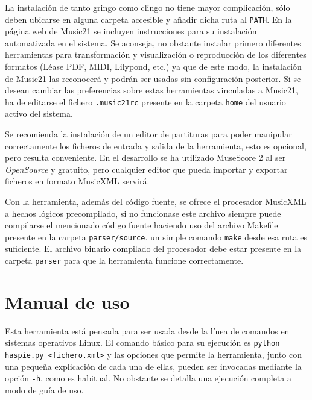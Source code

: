 La instalación de tanto gringo como clingo no tiene mayor complicación, sólo deben ubicarse en alguna carpeta accesible y añadir dicha ruta al \texttt{PATH}. En la página web de Music21 se incluyen instrucciones para su instalación automatizada en el sistema. Se aconseja, no obstante instalar primero diferentes herramientas para transformación y visualización o reproducción de los diferentes formatos (Léase PDF, MIDI, Lilypond, etc.) ya que de este modo, la instalación de Music21 las reconocerá y podrán ser usadas sin configuración posterior. Si se desean cambiar las preferencias sobre estas herramientas vinculadas a Music21, ha de editarse el fichero \texttt{.music21rc} presente en la carpeta \texttt{home} del usuario activo del sistema.
	
Se recomienda la instalación de un editor de partituras para poder manipular correctamente los ficheros de entrada y salida de la herramienta, esto es opcional, pero resulta conveniente. En el desarrollo se ha utilizado MuseScore 2 al ser \textit{OpenSource} y gratuito, pero cualquier editor que pueda importar y exportar ficheros en formato MusicXML servirá.

Con la herramienta, además del código fuente, se ofrece el procesador MusicXML a hechos lógicos precompilado, si no funcionase este archivo siempre puede compilarse el mencionado código fuente haciendo uso del archivo Makefile presente en la carpeta \texttt{parser/source}. un simple comando \texttt{make} desde esa ruta es suficiente. El archivo binario compilado del procesador debe estar presente en la carpeta \texttt{parser} para que la herramienta funcione correctamente.

\chapter{Manual de uso}
Esta herramienta está pensada para ser usada desde la línea de comandos en sistemas operativos Linux. El comando básico para su ejecución es \texttt{python haspie.py <fichero.xml>} y las opciones que permite la herramienta, junto con una pequeña explicación de cada una de ellas, pueden ser invocadas mediante la opción \texttt{-h}, como es habitual. No obstante se detalla una ejecución completa a modo de guía de uso.

